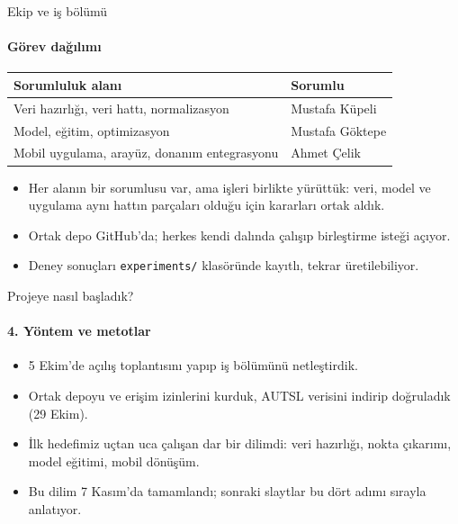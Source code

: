 \documentclass[aspectratio=169,11pt]{beamer}
\begin{document}
\begin{frame}{Ekip ve iş bölümü}
\framesubtitle{Görev dağılımı}
\centering
\begin{tabular}{@{}ll@{}}
\toprule
\textbf{Sorumluluk alanı} & \textbf{Sorumlu} \\
\midrule
Veri hazırlığı, veri hattı, normalizasyon & Mustafa Küpeli \\
Model, eğitim, optimizasyon & Mustafa Göktepe \\
Mobil uygulama, arayüz, donanım entegrasyonu & Ahmet Çelik \\
\bottomrule
\end{tabular}

\vspace{6mm}
\begin{itemize}
\item Her alanın bir sorumlusu var, ama işleri birlikte yürüttük: veri, model ve uygulama aynı hattın parçaları olduğu için kararları ortak aldık.
\item Ortak depo GitHub'da; herkes kendi dalında çalışıp birleştirme isteği açıyor.
\item Deney sonuçları \texttt{experiments/} klasöründe kayıtlı, tekrar üretilebiliyor.
\end{itemize}
\end{frame}

\begin{frame}{Projeye nasıl başladık?}
\framesubtitle{4. Yöntem ve metotlar}
\begin{itemize}
\item 5 Ekim'de açılış toplantısını yapıp iş bölümünü netleştirdik.
\item Ortak depoyu ve erişim izinlerini kurduk, AUTSL verisini indirip doğruladık (29 Ekim).
\item İlk hedefimiz uçtan uca çalışan dar bir dilimdi: veri hazırlığı, nokta çıkarımı, model eğitimi, mobil dönüşüm.
\item Bu dilim 7 Kasım'da tamamlandı; sonraki slaytlar bu dört adımı sırayla anlatıyor.
\end{itemize}
\end{frame}
\end{document}
